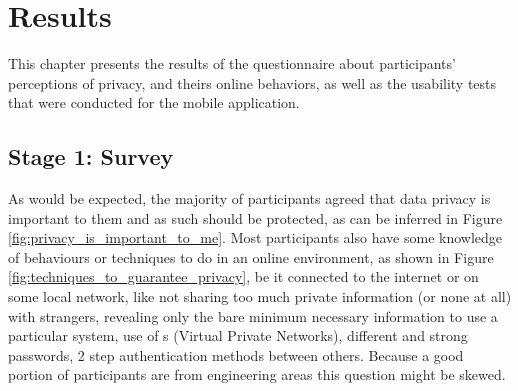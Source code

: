 %
%
\section{Results}\label{section:results}

\par
This chapter presents the results of the questionnaire about participants'
perceptions of privacy, \hyperlink{\acronym}{\acronym} and theirs online behaviors, as well as the usability
tests that were conducted for the mobile application.

\subsection{Stage 1: Survey}\label{subsection:stage_1_survey}

As would be expected, the majority of participants agreed that data privacy
is important to them and as such should be protected, as can be inferred
in Figure \ref{fig:privacy_is_important_to_me}. Most participants
also have some knowledge of behaviours or techniques to do
in an online environment, as shown in Figure \ref{fig:techniques_to_guarantee_privacy}, be it connected to the internet or on some
local network, like not sharing too much private information
(or none at all) with strangers, revealing only the bare minimum necessary
information to use a particular system, use of \hyperlink{\acronym}{\acronym}s (Virtual Private Networks), different and strong
passwords, 2 step authentication methods between others. Because a good
portion of participants are from engineering areas this question might be
skewed.

